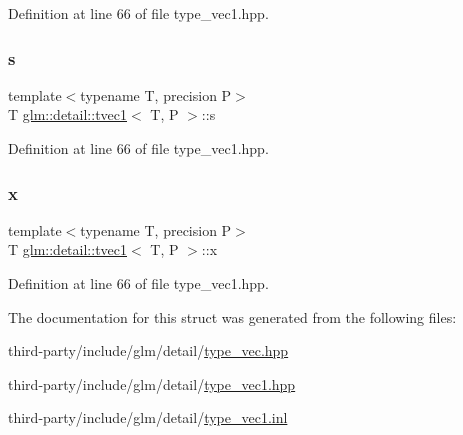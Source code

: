 Definition at line 66 of file type\+\_\+vec1.\+hpp.

\mbox{\label{structglm_1_1detail_1_1tvec1_a1025b03a3e1f99c7a42518af40737d7b}} 
\subsubsection{\texorpdfstring{s}{s}}
{\footnotesize\ttfamily template$<$typename T, precision P$>$ \\
T \hyperlink{structglm_1_1detail_1_1tvec1}{glm\+::detail\+::tvec1}$<$ T, P $>$\+::s}



Definition at line 66 of file type\+\_\+vec1.\+hpp.

\mbox{\label{structglm_1_1detail_1_1tvec1_a6d6f02bf4a9d0129762489169fc2f9dc}} 
\subsubsection{\texorpdfstring{x}{x}}
{\footnotesize\ttfamily template$<$typename T, precision P$>$ \\
T \hyperlink{structglm_1_1detail_1_1tvec1}{glm\+::detail\+::tvec1}$<$ T, P $>$\+::x}



Definition at line 66 of file type\+\_\+vec1.\+hpp.



The documentation for this struct was generated from the following files\+:\begin{DoxyCompactItemize}
\item 
third-\/party/include/glm/detail/\hyperlink{type__vec_8hpp}{type\+\_\+vec.\+hpp}\item 
third-\/party/include/glm/detail/\hyperlink{type__vec1_8hpp}{type\+\_\+vec1.\+hpp}\item 
third-\/party/include/glm/detail/\hyperlink{type__vec1_8inl}{type\+\_\+vec1.\+inl}\end{DoxyCompactItemize}
